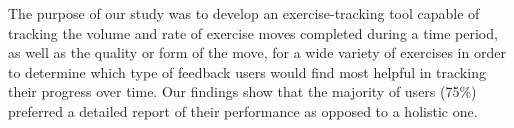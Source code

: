 The purpose of our study was to develop an exercise-tracking tool capable of tracking the volume and rate of exercise moves completed during a time period, as well as the quality or form of the move, for a wide variety of exercises in order to determine which type of feedback users would find most helpful in tracking their progress over time. Our findings show that the majority of users (75\%) preferred a detailed report of their performance as opposed to a holistic one.